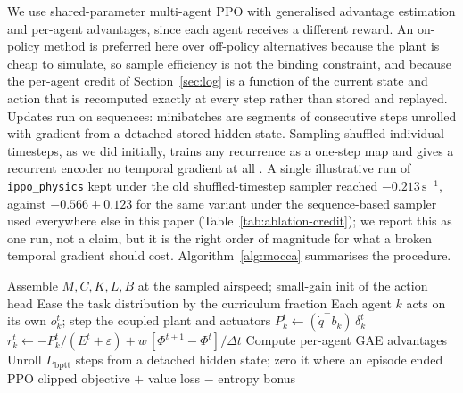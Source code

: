 \documentclass[preprint,11pt,authoryear]{elsarticle}
\begin{document}
We use shared-parameter multi-agent PPO \citep{schulman2017ppo,yu2022mappo} with
generalised advantage estimation \citep{schulman2016gae} and per-agent
advantages, since each agent receives a different reward. An on-policy method is
preferred here over off-policy alternatives \citep{lillicrap2016ddpg,
haarnoja2018sac} because the plant is cheap to simulate, so sample efficiency is
not the binding constraint, and because the per-agent credit of
Section~\ref{sec:log} is a function of the current state and action that is
recomputed exactly at every step rather than stored and replayed. Updates run on
sequences: minibatches are segments of consecutive steps unrolled with gradient
from a detached stored hidden state. Sampling shuffled individual timesteps, as
we did initially, trains any recurrence as a one-step map and gives a recurrent
encoder no temporal gradient at all \citep{hausknecht2015drqn}. A single
illustrative run of \texttt{ippo\_physics} kept under the old shuffled-timestep
sampler reached $-0.213\,\mathrm{s}^{-1}$, against $-0.566\pm0.123$ for the same
variant under the sequence-based sampler used everywhere else in this paper
(Table~\ref{tab:ablation-credit}); we report this as one run, not a claim, but
it is the right order of magnitude for what a broken temporal gradient should
cost. Algorithm~\ref{alg:mocca} summarises the procedure.

\begin{algorithm}[t]
\caption{Training with the blended (exact-plus-shaping) credit}
\label{alg:mocca}
\begin{algorithmic}[1]
\State Assemble $M,C,K,L,B$ at the sampled airspeed; small-gain init of the
action head
  \State Ease the task distribution by the curriculum fraction
    \State Each agent $k$ acts on its own $o_k^t$; step the coupled plant and
    actuators
    \State $P_k^t \gets (\dot q^\top b_k)\,\delta_k^t$
    \State $r_k^t \gets -P_k^t/(E^t+\varepsilon)
      + w\,[\Phi^{t+1}-\Phi^{t}]/\Delta t$
  \EndFor
  \State Compute per-agent GAE advantages
    \State Unroll $L_{\mathrm{bptt}}$ steps from a detached hidden state; zero it
    where an episode ended
    \State PPO clipped objective $+$ value loss $-$ entropy bonus
  \EndFor
\EndFor
\end{algorithmic}
\end{algorithm}
\end{document}
